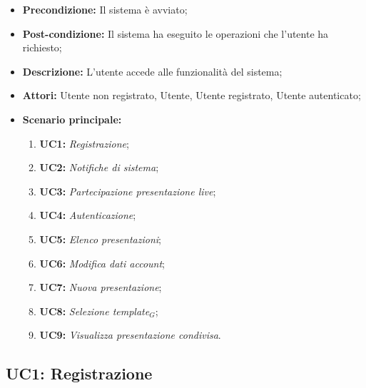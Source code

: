 \begin{itemize}
	\item \textbf{Precondizione:} Il sistema è avviato;
	\item \textbf{Post-condizione:} Il sistema ha eseguito le operazioni che l'utente ha richiesto;
	\item \textbf{Descrizione:} L'utente accede alle funzionalità del sistema;
	\item \textbf{Attori:} Utente non registrato, Utente, Utente registrato, Utente autenticato;
	\item \textbf{Scenario principale:}
	\begin{enumerate}
		\item \textbf{ UC1:} \textit{ Registrazione};
		\item \textbf{ UC2:} \textit{ Notifiche di sistema};
		\item \textbf{ UC3:} \textit{ Partecipazione presentazione live};
		\item \textbf{ UC4:} \textit{ Autenticazione};
		\item \textbf{ UC5:} \textit{ Elenco presentazioni};
		\item \textbf{ UC6:} \textit{ Modifica dati account};
		\item \textbf{ UC7:} \textit{ Nuova presentazione};
		\item \textbf{ UC8:} \textit{ Selezione template$_G$};
		\item \textbf{ UC9:} \textit{ Visualizza presentazione condivisa}.
	\end{enumerate}
\end{itemize}
\newpage
\subsection{ UC1: Registrazione}

